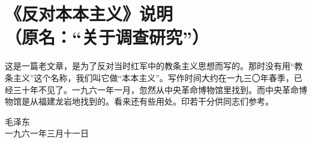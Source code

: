 \section[《反对本本主义》说明（一九六一年三月十一日）]{《反对本本主义》说明\\{\large（原名：“关于调查研究”）}}

这是一篇老文章，是为了反对当时红军中的教条主义思想而写的。那时没有用“教条主义”这个名称，我们叫它做“本本主义”。写作时间大约在一九三〇年春季，已经三十年不见了。一九六一年一月，忽然从中央革命博物馆里找到。而中央革命博物馆是从福建龙岩地找到的。看来还有些用处。印若干分供同志们参考。

{\raggedleft 毛泽东\\一九六一年三月十一日\par}


